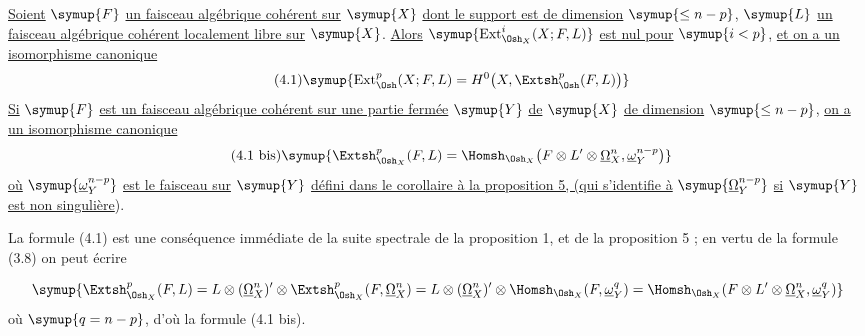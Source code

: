  \uline{Soient} $\symup{F}$ \uline{un faisceau algébrique cohérent sur} $\symup{X}$ \uline{dont le
support est de dimension} $\symup{\leq n-p}$, $\symup{L}$ \uline{un faisceau algébrique cohérent
localement libre sur} $\symup{X}$. \uline{Alors} $\symup{\operatorname{Ext}_{\Osh_X}^{i}(X;F,L)}$ \uline{est nul
pour} $\symup{i<p}$, \uline{et on a un isomorphisme canonique}
\begin{equation}\tag{4.1}
  \symup{\operatorname{Ext}_{\Osh}^{p}(X;F,L)
  =H^{0}\bigl(X,\Extsh_{\Osh}^{p}(F,L)\bigr)}
\end{equation}
\uline{Si} $\symup{F}$ \uline{est un faisceau algébrique cohérent sur une partie fermée} $\symup{Y}$ \uline{de} $\symup{X}$ \uline{de
dimension} $\symup{\leq n-p}$, \uline{on a un isomorphisme canonique}
\begin{equation}\tag{4.1 bis}
  \symup{\Extsh_{\Osh_X}^{p}(F,L)
  =\Homsh_{\Osh_X}\!\left(
    F\otimes L'\otimes\underline{\Omega}_X^{n},\underline{\omega}_Y^{n-p}
  \right)}
\end{equation}
\uline{où} $\symup{\underline{\omega}_Y^{n-p}}$ \uline{est le faisceau sur} $\symup{Y}$ \uline{défini dans le corollaire à la
proposition 5, (qui s'identifie à} $\symup{\underline{\Omega}_Y^{n-p}}$ \uline{si} $\symup{Y}$ \uline{est non singulière}).

La formule (4.1) est une conséquence immédiate de la suite spectrale de la
proposition 1, et de la proposition 5 ; en vertu de la formule (3.8) on peut
écrire

\[
\symup{\Extsh_{\Osh_X}^{p}(F,L)
=L\otimes(\underline{\Omega}_X^{n})'\otimes
  \Extsh_{\Osh_X}^{p}(F,\underline{\Omega}_X^{n})
=L\otimes(\underline{\Omega}_X^{n})'\otimes
  \Homsh_{\Osh_X}(F,\underline{\omega}_Y^{q})
=\Homsh_{\Osh_X}\!\left(
  F\otimes L'\otimes\underline{\Omega}_X^{n},\underline{\omega}_Y^{q}\right)}
\]
où $\symup{q=n-p}$, d'où la formule (4.1 bis).

